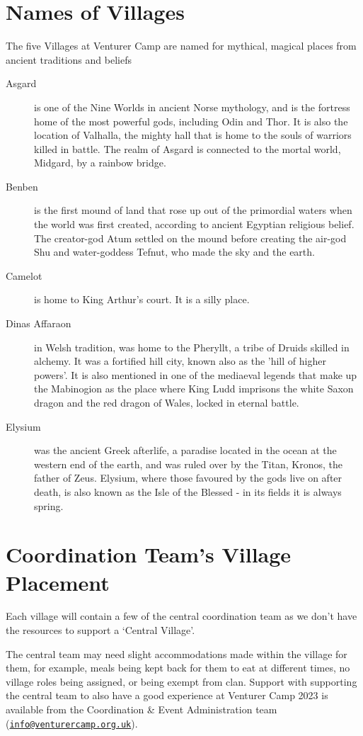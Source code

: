 \documentclass[a4paper, 11pt]{report}
\makeatletter
\newcommand{\nl}{\newline}
\newcommand{\infoemail}{\href{mailto:info@venturercamp.org.uk}{\texttt{info@venturercamp.org.uk}}}
\makeatother
\begin{document}
\section{Names of Villages}
The five Villages at Venturer Camp are named for mythical, magical places from ancient traditions and beliefs
\begin{description}
    \item[Asgard] is one of the Nine Worlds in ancient Norse mythology, and is the fortress home of the most powerful gods, including Odin and Thor. It is also the location of Valhalla, the mighty hall that is home to the souls of warriors killed in battle. The realm of Asgard is connected to the mortal world, Midgard, by a rainbow bridge.
    \item[Benben] is the first mound of land that rose up out of the primordial waters when the world was first created, according to ancient Egyptian religious belief. The creator-god Atum settled on the mound before creating the air-god Shu and water-goddess Tefnut, who made the sky and the earth.
    \item[Camelot] is home to King Arthur's court. It is a silly place.
    \item[Dinas Affaraon] in Welsh tradition, was home to the Pheryllt, a tribe of Druids skilled in alchemy. It was a fortified hill city, known also as the 'hill of higher powers'. It is also mentioned in one of the mediaeval legends that make up the Mabinogion as the place where King Ludd imprisons the white Saxon dragon and the red dragon of Wales, locked in eternal battle.
    \item[Elysium] was the ancient Greek afterlife, a paradise located in the ocean at the western end of the earth, and was ruled over by the Titan, Kronos, the father of Zeus. Elysium, where those favoured by the gods live on after death, is also known as the Isle of the Blessed - in its fields it is always spring.
\end{description}

\section{Coordination Team's Village Placement}
Each village will contain a few of the central coordination team as we don't have the resources to support a `Central Village'.\nl

The central team may need slight accommodations made within the village for them, for example, meals being kept back for them to eat at different times, no village roles being assigned, or being exempt from clan. Support with supporting the central team to also have a good experience at Venturer Camp 2023 is available from the Coordination \& Event Administration team (\infoemail).\nl
\end{document}
